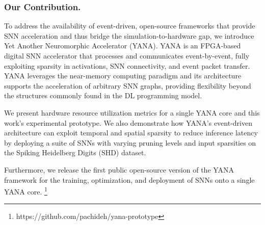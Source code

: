 \subsubsection{Our Contribution.}
To address the availability of event-driven, open-source frameworks that provide \ac{SNN} acceleration and thus bridge the simulation-to-hardware gap, we introduce Yet Another Neuromorphic Accelerator (YANA). YANA is an FPGA-based digital SNN accelerator that processes and communicates event-by-event, fully exploiting sparsity in activations, SNN connectivity, and event packet transfer. 
YANA leverages the near-memory computing paradigm and its architecture supports the acceleration of arbitrary SNN graphs, providing flexibility beyond the structures commonly found in the \ac{DL} programming model.

We present hardware resource utilization metrics for a single YANA core and this work's experimental prototype. We also demonstrate how YANA's event-driven architecture can exploit temporal and spatial sparsity to reduce inference latency by deploying a suite of \acp{SNN} with varying pruning levels and input sparsities on the Spiking Heidelberg Digits (SHD) \cite{cramer_heidelberg_2022} dataset.

Furthermore, we release the first public open-source version of the YANA framework for the training, optimization, and deployment of SNNs onto a single YANA core.
\footnote[1]{https://github.com/pachideh/yana-prototype}